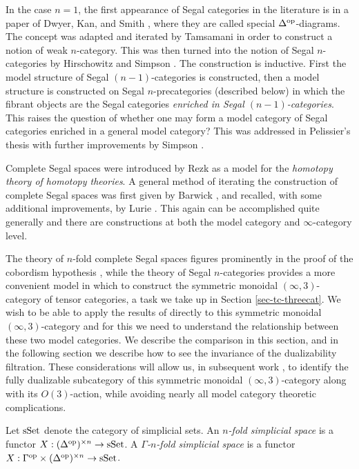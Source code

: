 \documentclass{amsart}
\begin{document}
In the case $n=1$, the first appearance of Segal categories in the literature is in a paper of Dwyer, Kan, and Smith \cite{MR984042}, where they are called special $\Delta^{\mathrm{op}}$-diagrams. The concept was adapted and iterated by Tamsamani \cite{Tamsamani:thesis} in order to construct a notion of weak $n$-category. This was then turned into the notion of Segal $n$-categories by Hirschowitz and Simpson \cite{9807049}. The construction is inductive.  First the model structure of Segal $(n-1)$-categories is constructed, then a model structure is constructed on Segal $n$-precategories (described below) in which the fibrant objects are the Segal categories {\em enriched in Segal $(n-1)$-categories}. This raises the question of whether one may form a model category of Segal categories enriched in a general model category? This was addressed in Pelissier's thesis \cite{Pelissier:thesis} with further improvements by Simpson \cite{1001.4071}.  

Complete Segal spaces were introduced by Rezk \cite{MR1804411} as a model for the {\em homotopy theory of homotopy theories}.  A general method of iterating the construction of complete Segal spaces was first given by Barwick \cite{Barwick:thesis}, and recalled, with some additional improvements, by Lurie \cite{0905.0462, MR2555928}. This again can be accomplished quite generally and there are constructions at both the model category and $\infty$-category level. 

The theory of $n$-fold complete Segal spaces figures prominently in the proof of the cobordism hypothesis \cite{MR2555928}, while the theory of Segal $n$-categories provides a more convenient model in which to construct the symmetric monoidal $(\infty,3)$-category of tensor categories, a task we take up in Section \ref{sec-tc-threecat}. We wish to be able to apply the results of \cite{MR2555928} directly to this symmetric monoidal $(\infty,3)$-category and for this we need to understand the relationship between these two model categories. We describe the comparison in this section, and in the following section we describe how to see the invariance of the dualizability filtration. These considerations will allow us, in subsequent work \cite{DSPS}, to identify the fully dualizable subcategory of this symmetric monoidal $(\infty,3)$-category along with its $O(3)$-action, while avoiding nearly all model category theoretic complications. 

\begin{definition}
	Let $\mathrm{sSet}$ denote the category of simplicial sets. An {\em $n$-fold simplicial space} is a functor $X: (\Delta^\textrm{op})^{\times n} \to \mathrm{sSet}$. A {\em $\Gamma$-$n$-fold simplicial space} is a functor $X: \Gamma^\textrm{op} \times (\Delta^\textrm{op})^{\times n} \to \mathrm{sSet}$.
\end{definition}
\end{document}

